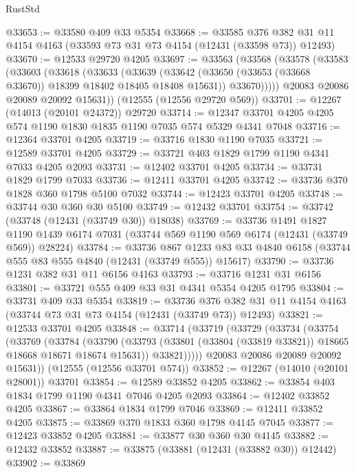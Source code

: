 \begin{lexlean}{RustStd}
\begin{coremodule}
@33653 := @33580 @409 @33 @5354
@33668 := @33585
    @376
    @382
    @31
    @11
    @4154
    @4163
    (@33593 @73 @31 @73 @4154 (@12431 (@33598 @73)) @12493)
@33670 := @12533 @29720 @4205
@33697 := @33563
    (@33568
      (@33578
        (@33583
          (@33603
            (@33618
              (@33633
                (@33639
                  (@33642 (@33650 (@33653 (@33668 @33670)) @18399 @18402 @18405 @18408 @15631))
                  @33670)))))
        @20083
        @20086
        @20089
        @20092
        @15631))
    (@12555 (@12556 @29720 @569))
@33701 := @12267 (@14013 (@20101 @24372)) @29720
@33714 := @12347 @33701 @4205 @4205 @574 @1190 @1830 @1835 @1190 @7035 @574 @5329 @4341 @7048
@33716 := @12364 @33701 @4205
@33719 := @33716 @1830 @1190 @7035
@33721 := @12589 @33701 @4205
@33729 := @33721 @403 @1829 @1799 @1190 @4341 @7033 @4205 @2093
@33731 := @12402 @33701 @4205
@33734 := @33731 @1829 @1799 @7033
@33736 := @12411 @33701 @4205
@33742 := @33736 @370 @1828 @360 @1798 @5100 @7032
@33744 := @12423 @33701 @4205
@33748 := @33744 @30 @360 @30 @5100
@33749 := @12432 @33701
@33754 := @33742 (@33748 (@12431 (@33749 @30)) @18038)
@33769 := @33736
    @1491
    @1827
    @1190
    @1439
    @6174
    @7031
    (@33744 @569 @1190 @569 @6174 (@12431 (@33749 @569)) @28224)
@33784 := @33736
    @867
    @1233
    @83
    @33
    @4840
    @6158
    (@33744 @555 @83 @555 @4840 (@12431 (@33749 @555)) @15617)
@33790 := @33736 @1231 @382 @31 @11 @6156 @4163
@33793 := @33716 @1231 @31 @6156
@33801 := @33721 @555 @409 @33 @31 @4341 @5354 @4205 @1795
@33804 := @33731 @409 @33 @5354
@33819 := @33736
    @376
    @382
    @31
    @11
    @4154
    @4163
    (@33744 @73 @31 @73 @4154 (@12431 (@33749 @73)) @12493)
@33821 := @12533 @33701 @4205
@33848 := @33714
    (@33719
      (@33729
        (@33734
          (@33754
            (@33769
              (@33784
                (@33790
                  (@33793 (@33801 (@33804 (@33819 @33821)) @18665 @18668 @18671 @18674 @15631))
                  @33821)))))
        @20083
        @20086
        @20089
        @20092
        @15631))
    (@12555 (@12556 @33701 @574))
@33852 := @12267 (@14010 (@20101 @28001)) @33701
@33854 := @12589 @33852 @4205
@33862 := @33854 @403 @1834 @1799 @1190 @4341 @7046 @4205 @2093
@33864 := @12402 @33852 @4205
@33867 := @33864 @1834 @1799 @7046
@33869 := @12411 @33852 @4205
@33875 := @33869 @370 @1833 @360 @1798 @4145 @7045
@33877 := @12423 @33852 @4205
@33881 := @33877 @30 @360 @30 @4145
@33882 := @12432 @33852
@33887 := @33875 (@33881 (@12431 (@33882 @30)) @12442)
@33902 := @33869

\end{coremodule}
\end{lexlean}

